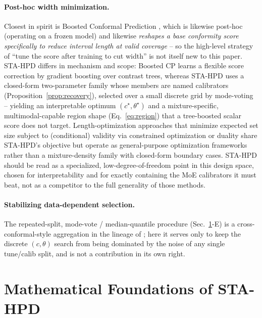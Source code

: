 \documentclass[10pt,twocolumn,a4paper]{article}
\begin{document}
\paragraph{Post-hoc width minimization.} Closest in spirit is Boosted Conformal Prediction
\cite{xie2024boosted}, which is likewise post-hoc (operating on a frozen model) and likewise
\emph{reshapes a base conformity score specifically to reduce interval length at valid coverage} --
so the high-level strategy of ``tune the score after training to cut width'' is not itself new to
this paper. STA-HPD differs in mechanism and scope: Boosted CP learns a flexible score correction by
gradient boosting over contrast trees, whereas STA-HPD uses a closed-form two-parameter family whose
members are named calibrators (Proposition~\ref{prop:recovery}), selected over a small discrete grid
by mode-voting -- yielding an interpretable optimum $(c^\star,\theta^\star)$ and a mixture-specific,
multimodal-capable region shape (Eq.~\eqref{eq:region}) that a tree-boosted scalar score does not
target. Length-optimization approaches that minimize expected set size subject to (conditional)
validity via constrained optimization or duality \cite{kiyani2024length} share STA-HPD's objective
but operate as general-purpose optimization frameworks rather than a mixture-density family with
closed-form boundary cases. STA-HPD should be read as a specialized, low-degree-of-freedom point in
this design space, chosen for interpretability and for exactly containing the MoE calibrators it
must beat, not as a competitor to the full generality of those methods.

\paragraph{Stabilizing data-dependent selection.} The repeated-split, mode-vote / median-quantile
procedure (Sec.~\ref{sec:math}-E) is a cross-conformal-style aggregation in the lineage of
\cite{gibbs2021adaptive,tibshirani2019conformal}; here it serves only to keep the discrete
$(c,\theta)$ search from being dominated by the noise of any single tune/calib split, and is not a
contribution in its own right.

\section{Mathematical Foundations of STA-HPD}
\label{sec:math}
\end{document}
